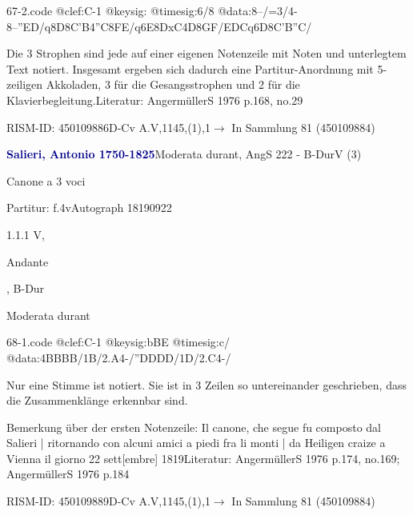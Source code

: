 \documentclass[a4paper, twocolumn, 11pt]{book}
\begin{document}
\begin{filecontents*}{67-2.code}
@clef:C-1
@keysig:
@timesig:6/8
@data:8--/=3/4-8--''ED/q8D{8C'B}4''C8FE/q6E{8DxC}4D8GF/{ED}Cq6D{8C'B}''C/
\end{filecontents*}
\newline %
\par Die 3 Strophen sind jede auf einer eigenen Notenzeile mit Noten und unterlegtem Text notiert. Insgesamt ergeben sich dadurch eine Partitur-Anordnung mit 5-zeiligen Akkoladen, 3 für die Gesangsstrophen und 2 für die Klavierbegleitung.\newline Literatur: AngermüllerS 1976  p.168, no.29
\par RISM-ID: 450109886\newline D-Cv  A.V,1145,(1),1\newline $\rightarrow$ In Sammlung 81 (450109884)
      
\par \vspace{16pt} \textcolor{darkblue}{\textbf{Salieri, Antonio  1750-1825}}\hfillplus{[68]}\newline Moderata durant, AngS 222 - B-Dur\newline V (3)
\par \begin{itshape} Canone a 3 voci\end{itshape} 
\par \textcolor{darkblue}{}  Partitur: f.4v\newline Autograph  18190922
\par 1.1.1  V, \begin{itshape}Andante\end{itshape}, B-Dur\newline \begin{footnotesize} Moderata durant \end{footnotesize}  
\begin{filecontents*}{68-1.code}
@clef:C-1
@keysig:bBE
@timesig:c/
@data:4BBBB/1B/2.A4-/''DDDD/1D/2.C4-/
\end{filecontents*}
\newline %
\par Nur eine Stimme ist notiert. Sie ist in 3 Zeilen so untereinander geschrieben, dass die Zusammenklänge erkennbar sind.
\par Bemerkung über der ersten Notenzeile: {\textquotedbl}Il canone, che segue fu composto dal Salieri | ritornando con alcuni amici a piedi fra li monti | da Heiligen craize a Vienna il giorno 22 sett[embre] 1819{\textquotedbl}\newline Literatur: AngermüllerS 1976  p.174, no.169; AngermüllerS 1976  p.184
\par RISM-ID: 450109889\newline D-Cv  A.V,1145,(1),1\newline $\rightarrow$ In Sammlung 81 (450109884)
      
\end{document}
